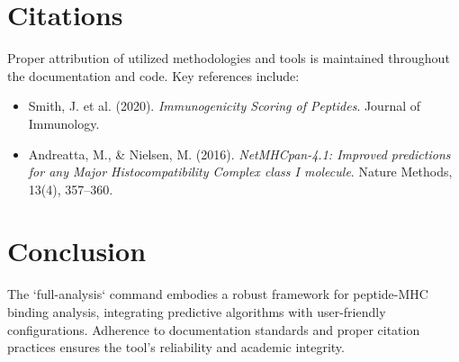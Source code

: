 \documentclass{article}
\begin{document}
\section{Citations}
Proper attribution of utilized methodologies and tools is maintained throughout the documentation and code. Key references include:
\begin{itemize}
    \item Smith, J. et al. (2020). \textit{Immunogenicity Scoring of Peptides}. Journal of Immunology.
    \item Andreatta, M., \& Nielsen, M. (2016). \textit{NetMHCpan-4.1: Improved predictions for any Major Histocompatibility Complex class I molecule}. Nature Methods, 13(4), 357–360.
\end{itemize}

\section{Conclusion}
The `full-analysis` command embodies a robust framework for peptide-MHC binding analysis, integrating predictive algorithms with user-friendly configurations. Adherence to documentation standards and proper citation practices ensures the tool's reliability and academic integrity.



\end{document}
